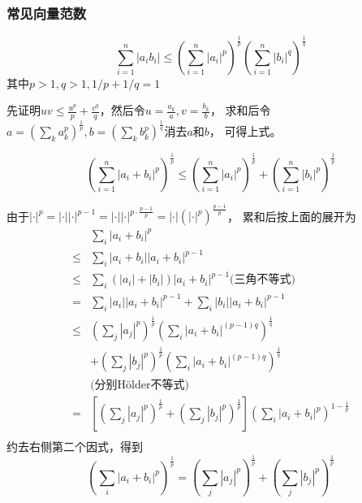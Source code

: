 \subsubsection{常见向量范数}

\begin{lemma}[H\"{o}lder不等式]
    \[
        \sum_{i=1}^{n}\left|a_{i} b_{i}\right| \leq
        \left(\sum_{i=1}^{n}\left|a_{i}\right|^{p}\right)^{\frac{1}{p}}
        \left(\sum_{i=1}^{n}\left|b_{i}\right|^{q}\right)^{\frac{1}{q}}
    \]
    其中$p>1, q>1, 1/p + 1/q=1$
\end{lemma}
先证明$uv\leq \frac{u^p}{p}+\frac{v^q}{q}$，然后令$u=\frac{a_k}{a},v=\frac{b_k}{b}$，
求和后令$a=\left( \sum\limits_k a_k^p \right)^{\frac{1}{p}},b=\left( \sum\limits_k b_k^p \right)^{\frac{1}{q}}$消去$a$和$b$，
可得上式。

\begin{lemma}[Minkowski不等式]
    \[
        \left(\sum_{i=1}^{n}\left|a_{i} + b_{i}\right|^p\right)^{\frac{1}{p}} \leq
        \left(\sum_{i=1}^{n}\left|a_{i}\right|^{p}\right)^{\frac{1}{p}} +
        \left(\sum_{i=1}^{n}\left|b_{i}\right|^{p}\right)^{\frac{1}{p}}
    \]
\end{lemma}

由于$|\cdot|^p = |\cdot| |\cdot|^{p-1} = |\cdot| |\cdot|^{p\cdot \frac{p-1}{p}} = |\cdot| (|\cdot|^p)^{\frac{p-1}{p}}$，
累和后按上面的展开为
\[
\begin{split}
    & \sum\limits_i |a_i+b_i|^p \\
    \leq& \sum\limits_i |a_i+b_i| |a_i+b_i|^{{p-1}} \\
    \leq& \sum\limits_i (|a_i|+|b_i|) |a_i+b_i|^{{p-1}} \text{(三角不等式)} \\
    =& \sum\limits_i |a_i| |a_i+b_i|^{{p-1}} + \sum\limits_i |b_i| |a_i+b_i|^{{p-1}} \\
    \leq& \left(\sum\limits_j |a_j|^p\right)^\frac{1}{p}
        \left( \sum\limits_i |a_i+b_i|^{(p-1)q} \right)^{\frac{1}{q}} \\
        &+ \left(\sum\limits_j |b_j|^p\right)^\frac{1}{p}
        \left( \sum\limits_i |a_i+b_i|^{(p-1)q} \right)^{\frac{1}{q}} \\
        &\text{(分别H\"{o}lder不等式)} \\
    =& \left[\left(\sum\limits_j |a_j|^p\right)^\frac{1}{p}+\left(\sum\limits_j |b_j|^p\right)^\frac{1}{p}\right]
        \left( \sum\limits_i |a_i+b_i|^p \right)^{1-\frac{1}{p}} \\
\end{split}
\]
约去右侧第二个因式，得到
\[
    \left( \sum\limits_i |a_i+b_i|^p \right)^\frac{1}{p} =
    \left(\sum\limits_j |a_j|^p\right)^\frac{1}{p}+\left(\sum\limits_j |b_j|^p\right)^\frac{1}{p}
\]


